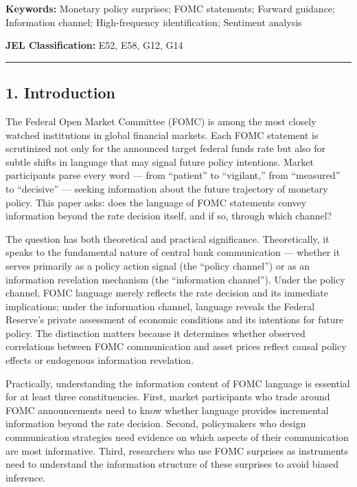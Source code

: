 \documentclass[
]{article}
\begin{document}
\textbf{Keywords:} Monetary policy surprises; FOMC statements; Forward
guidance; Information channel; High-frequency identification; Sentiment
analysis

\textbf{JEL Classification:} E52, E58, G12, G14

\begin{center}\rule{0.5\linewidth}{0.5pt}\end{center}

\subsection{1. Introduction}\label{introduction}

The Federal Open Market Committee (FOMC) is among the most closely
watched institutions in global financial markets. Each FOMC statement is
scrutinized not only for the announced target federal funds rate but
also for subtle shifts in language that may signal future policy
intentions. Market participants parse every word --- from ``patient'' to
``vigilant,'' from ``measured'' to ``decisive'' --- seeking information
about the future trajectory of monetary policy. This paper asks: does
the language of FOMC statements convey information beyond the rate
decision itself, and if so, through which channel?

The question has both theoretical and practical significance.
Theoretically, it speaks to the fundamental nature of central bank
communication --- whether it serves primarily as a policy action signal
(the ``policy channel'') or as an information revelation mechanism (the
``information channel''). Under the policy channel, FOMC language merely
reflects the rate decision and its immediate implications; under the
information channel, language reveals the Federal Reserve's private
assessment of economic conditions and its intentions for future policy.
The distinction matters because it determines whether observed
correlations between FOMC communication and asset prices reflect causal
policy effects or endogenous information revelation.

Practically, understanding the information content of FOMC language is
essential for at least three constituencies. First, market participants
who trade around FOMC announcements need to know whether language
provides incremental information beyond the rate decision. Second,
policymakers who design communication strategies need evidence on which
aspects of their communication are most informative. Third, researchers
who use FOMC surprises as instruments need to understand the information
structure of these surprises to avoid biased inference.
\end{document}
